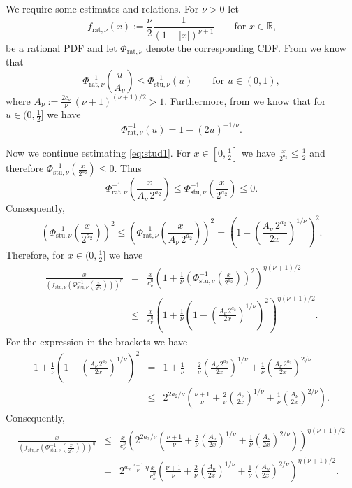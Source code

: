 \documentclass[namedate,webpdf,imanum]{ima-authoring-arxiv}%
\theoremstyle{thmstyletwo}%
\numberwithin{equation}{section}
\newcommand{\stu}{\mathrm{stu}}
\newcommand{\rat}{\mathrm{rat}}
\newcommand{\RR}{\mathbb{R}}
\begin{document}
We require some estimates and relations. For $\nu>0$ let $$f_{\rat,\nu}(x):=\frac{\nu}{2} \frac{1}{(1+|x|)^{\nu+1}}\qquad \mbox{for $x\in \RR$,}$$ be a rational PDF and let $\Phi_{\rat,\nu}$ denote the corresponding CDF. From \cite[Eq.~(15)]{KSWW10} we know that $$\Phi_{\rat,\nu}^{-1}\left(\frac{u}{A_\nu}\right) \le \Phi_{\stu,\nu}^{-1}(u) \qquad \mbox{for $u \in (0,1)$},$$ where $A_\nu:= \frac{2 c_\nu}{\nu} \, (\nu+1)^{(\nu+1)/2} > 1$. Furthermore, from \cite[Table~1]{KSWW10} we know that for $u \in (0,\tfrac{1}{2}]$ we have $$\Phi_{\rat,\nu}^{-1}(u)=1-(2 u)^{-1/\nu}.$$

Now we continue estimating \eqref{eq:stud1}. For $x \in [0,\frac{1}{2}]$ we have $\frac{x}{2^{a_2}}\le \frac{1}{2}$ and therefore $\Phi^{-1}_{\stu,\nu}(\frac{x}{2^{a_2}}) \le 0$. Thus $$\Phi_{\rat,\nu}^{-1}\left(\frac{x}{A_\nu \, 2^{a_2}}\right) \le \Phi_{\stu,\nu}^{-1}\left(\frac{x}{2^{a_2}}\right)\le 0.$$ Consequently, $$\left(\Phi_{\stu,\nu}^{-1}\left(\frac{x}{2^{a_2}}\right)\right)^2 \le \left(\Phi_{\rat,\nu}^{-1}\left(\frac{x}{A_\nu \, 2^{a_2}}\right) \right)^2=\left(1-\left(\frac{A_\nu \, 2^{a_2}}{2 x}\right)^{1/\nu}\right)^2.$$ Therefore, for $x \in (0,\frac{1}{2}]$ we have 
\begin{eqnarray*}
\frac{x}{\left(f_{\stu,\nu}\left(\Phi_{\stu,\nu}^{-1}\left( \frac{x}{2^{a_2}} \right)\right)\right)^{\eta}} & = & \frac{x}{c_{\nu}^{\eta}} \left(1+\frac{1}{\nu} \left(\Phi_{\stu,\nu}^{-1}\left(\frac{x}{2^{a_2}}\right)\right)^2\right)^{\eta (\nu+1)/2}   \\
& \le & \frac{x}{c_{\nu}^{\eta}} \left(1+\frac{1}{\nu} \left(1-\left(\frac{A_\nu \, 2^{a_2}}{2 x}\right)^{1/\nu}\right)^2\right)^{\eta (\nu+1)/2}.
\end{eqnarray*}
For the expression in the brackets we have
\begin{eqnarray*}
1+\frac{1}{\nu} \left(1-\left(\frac{A_\nu \, 2^{a_2}}{2 x}\right)^{1/\nu}\right)^2 & = & 1+\frac{1}{\nu}-\frac{2}{\nu} \left(\frac{A_\nu \, 2^{a_2}}{2 x} \right)^{1/\nu} + \frac{1}{\nu} \left(\frac{A_\nu \, 2^{a_2}}{2 x} \right)^{2/\nu}\\
& \le & 2^{2 a_2/\nu} \left(\frac{\nu+1}{\nu}+\frac{2}{\nu} \left(\frac{A_\nu}{2 x} \right)^{1/\nu} + \frac{1}{\nu} \left(\frac{A_\nu}{2 x} \right)^{2/\nu}\right).%
\end{eqnarray*}
Consequently,
\begin{eqnarray*}
\frac{x}{\left(f_{\stu,\nu}\left(\Phi_{\stu,\nu}^{-1}\left( \frac{x}{2^{a_2}} \right)\right)\right)^{\eta}} & \le & \frac{x}{c_{\nu}^{\eta}} \left(2^{2 a_2/\nu} \left(\frac{\nu+1}{\nu}+\frac{2}{\nu} \left(\frac{A_\nu}{2 x} \right)^{1/\nu} + \frac{1}{\nu} \left(\frac{A_\nu}{2 x} \right)^{2/\nu}\right)\right)^{\eta (\nu+1)/2} \\
& = & 2^{a_2 \,  \frac{\nu+1}{\nu}\, \eta} \frac{x}{c_{\nu}^{\eta}} \left(\frac{\nu+1}{\nu}+\frac{2}{\nu} \left(\frac{A_\nu}{2 x} \right)^{1/\nu} + \frac{1}{\nu} \left(\frac{A_\nu}{2 x} \right)^{2/\nu}\right)^{\eta(\nu+1)/2}.
\end{eqnarray*}
\end{document}
